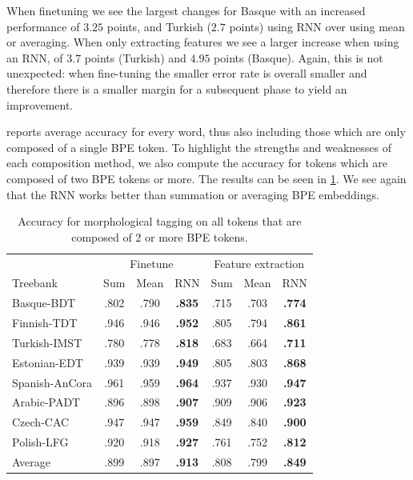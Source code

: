 \documentclass[11pt]{article}
\newcommand\jp[1]{(\textbf{JP:} #1)}
\begin{document}

        When finetuning we see the largest changes for Basque with an
        increased performance of $3.25$ points, and Turkish ($2.7$
        points) using RNN over using mean or averaging. When only
        extracting features we see a larger increase when using an
        RNN, of $3.7$ points (Turkish) and $4.95$ points
        (Basque). Again, this is not unexpected: when fine-tuning the
        smaller error rate is overall smaller and therefore there is a
        smaller margin for a subsequent phase to yield an improvement.

     reports average accuracy for every word,
    thus also including those which are only composed of a single BPE
    token. To highlight the strengths and weaknesses of each
    composition method, we also compute the accuracy for tokens which
    are composed of two BPE tokens or more. The results can be seen in
    \cref{tab:results_large_tokens}.  We see again that the RNN works
    better than summation or averaging BPE embeddings.
    
	\begin{table}%
	\centering
	\begin{tabular}{l|ccc|ccc}
		 & \multicolumn{3}{c}{Finetune} & \multicolumn{3}{c}{Feature extraction} \\
		Treebank & Sum & Mean & RNN & Sum & Mean & RNN  \\
		 \hline
        Basque-BDT      & .802 & .790 & \textbf{.835} & .715 & .703 & \textbf{.774} \\
		Finnish-TDT     & .946 & .946 & \textbf{.952} & .805 & .794 & \textbf{.861} \\ 
		Turkish-IMST    & .780 & .778 & \textbf{.818} & .683 & .664 & \textbf{.711} \\
		Estonian-EDT    & .939 & .939 & \textbf{.949} & .805 & .803 & \textbf{.868} \\
		Spanish-AnCora  & .961 & .959 & \textbf{.964} & .937 & .930 & \textbf{.947} \\
		Arabic-PADT     & .896 & .898 & \textbf{.907} & .909 & .906 & \textbf{.923}\\
		Czech-CAC       & .947 & .947 & \textbf{.959} & .849 & .840 & \textbf{.900} \\
		Polish-LFG      & .920 & .918 & \textbf{.927} & .761 & .752 & \textbf{.812} \\
        \hline
        Average         & .899 & .897 & \textbf{.913} & .808 & .799 & \textbf{.849} \\
	\end{tabular}
    \caption{\label{tab:results_large_tokens} Accuracy for
     morphological tagging on all tokens that are composed of 2 or
     more BPE tokens.}
\end{table}
\end{document}
